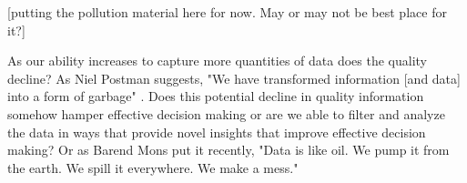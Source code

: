 [putting the pollution material here for now. May or may not be best place for it?]

As our ability increases to capture more quantities of data does the quality decline? As Niel Postman suggests, "We have transformed information [and data] into a form of garbage" \citep[cited in][p. 50]{stepp_1999}. Does this potential decline in quality information somehow hamper effective decision making or are we able to filter and analyze the data in ways that provide novel insights that improve effective decision making? Or as Barend Mons put it recently, "Data is like oil. We pump it from the earth. We spill it everywhere. We make a mess." \citep{mons_2016}